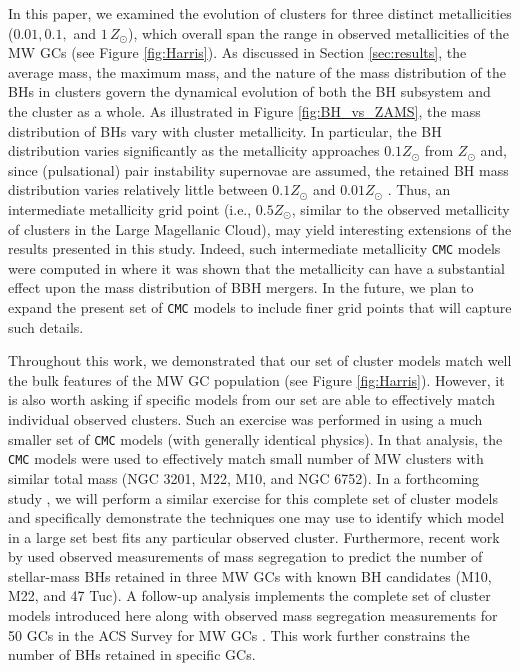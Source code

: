 \documentclass[twocolumn,tighten]{aastex63}
\begin{document}
In this paper, we examined the evolution of clusters for three distinct metallicities ($0.01, 0.1,$ and $1\,Z_{\odot}$), which overall span the range in observed metallicities of the MW GCs (see Figure \ref{fig:Harris}). As discussed in Section \ref{sec:results}, the average mass, the maximum mass, and the nature of the mass distribution of the BHs in clusters govern the dynamical evolution of both the BH subsystem and the cluster as a whole. As illustrated in Figure \ref{fig:BH_vs_ZAMS}, the mass distribution of BHs vary with cluster metallicity. In particular, the BH distribution varies significantly as the metallicity approaches $0.1Z_{\odot}$ from $Z_{\odot}$ and, since (pulsational) pair instability supernovae are assumed, the retained BH mass distribution varies relatively little between $0.1Z_{\odot}$ and $0.01Z_{\odot}$ \citep[see also, e.g.,][]{Belczynski2016b,Banerjee2019}. Thus, an intermediate metallicity grid point (i.e., $0.5Z_{\odot}$, similar to the observed metallicity of clusters in the Large Magellanic Cloud), may yield interesting extensions of the results presented in this study. Indeed, such intermediate metallicity \texttt{CMC} models were computed in \citet{Chatterjee2017b} where it was shown that the metallicity can have a substantial effect upon the mass distribution of BBH mergers. In the future, we plan to expand the present set of \texttt{CMC} models to include finer grid points that will capture such details.

Throughout this work, we demonstrated that our set of cluster models match well the bulk features of the MW GC population (see Figure \ref{fig:Harris}). However, it is also worth asking if specific models from our set are able to effectively match individual observed clusters. Such an exercise was performed in \citet{Kremer2019a} using a much smaller set of \texttt{CMC} models (with generally identical physics). In that analysis, the \texttt{CMC} models were used to effectively match small number of MW clusters with similar total mass (NGC 3201, M22, M10, and NGC 6752). In a forthcoming study \citep{Rui2019}, we will perform a similar exercise for this complete set of cluster models and specifically demonstrate the techniques one may use to identify which model in a large set best fits any particular observed cluster. Furthermore, recent work by \citet{Weatherford2018} used observed measurements of mass segregation to predict the number of stellar-mass BHs retained in three MW GCs with known BH candidates (M10, M22, and 47 Tuc). A follow-up analysis \citep{Weatherford2019} implements the complete set of cluster models introduced here along with observed mass segregation measurements for 50 GCs in the ACS Survey for MW GCs \citep{Sarajedini2007}. This work further constrains the number of BHs retained in specific GCs.
\end{document}
